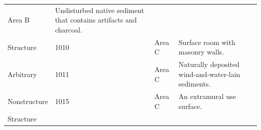 \documentclass[
  12pt,
]{krantz}
\begin{document}
\begin{longtable}[]{@{}llll@{}}
\begin{minipage}[t]{0.16\columnwidth}
Area B\strut
\end{minipage} & \begin{minipage}[t]{0.38\columnwidth}\raggedright
Undisturbed native sediment
that contains artifacts and
charcoal.\strut
\end{minipage}\tabularnewline
\begin{minipage}[t]{0.18\columnwidth}\raggedright
Structure\strut
\end{minipage} & \begin{minipage}[t]{0.11\columnwidth}\raggedright
1010\strut
\end{minipage} & \begin{minipage}[t]{0.16\columnwidth}\raggedright
Area C\strut
\end{minipage} & \begin{minipage}[t]{0.38\columnwidth}\raggedright
Surface room with masonry
walls.\strut
\end{minipage}\tabularnewline
\begin{minipage}[t]{0.18\columnwidth}\raggedright
Arbitrary\strut
\end{minipage} & \begin{minipage}[t]{0.11\columnwidth}\raggedright
1011\strut
\end{minipage} & \begin{minipage}[t]{0.16\columnwidth}\raggedright
Area C\strut
\end{minipage} & \begin{minipage}[t]{0.38\columnwidth}\raggedright
Naturally deposited
wind-and-water-lain
sediments.\strut
\end{minipage}\tabularnewline
\begin{minipage}[t]{0.18\columnwidth}\raggedright
Nonstructure\strut
\end{minipage} & \begin{minipage}[t]{0.11\columnwidth}\raggedright
1015\strut
\end{minipage} & \begin{minipage}[t]{0.16\columnwidth}\raggedright
Area C\strut
\end{minipage} & \begin{minipage}[t]{0.38\columnwidth}\raggedright
An extramural use surface.\strut
\end{minipage}\tabularnewline
\begin{minipage}[t]{0.18\columnwidth}\raggedright
Structure\strut
\end{minipage} & \begin{minipage}[t]{0.11\columnwidth}\raggedright

\end{minipage}
\end{longtable}
\end{document}
